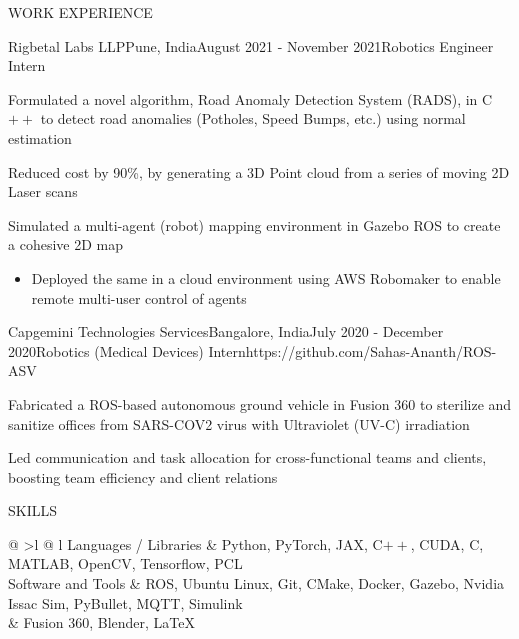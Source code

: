 \documentclass{resume} %
\begin{document}
\begin{rSection}{WORK EXPERIENCE}
	\begin{rProjExpDetails}{Rigbetal Labs LLP}{Pune, India}{August 2021 - November 2021}{Robotics Engineer Intern}{}{}
		\item Formulated a novel algorithm, Road Anomaly Detection System (RADS), in C$++$ to detect road anomalies (Potholes, Speed Bumps, etc.) using normal estimation
		\item Reduced cost by 90\%, by generating a 3D Point cloud from a series of moving 2D Laser scans
		\item Simulated a multi-agent (robot) mapping environment in Gazebo ROS to create a cohesive 2D map
		\begin{itemize}
			\item Deployed the same in a cloud environment using AWS Robomaker to enable remote multi-user control of agents
		\end{itemize}
	\end{rProjExpDetails}

	\begin{rProjExpDetails}{Capgemini Technologies Services}{Bangalore, India}{July 2020 - December 2020}{Robotics (Medical Devices) Intern}{https://github.com/Sahas-Ananth/ROS-ASV}{}
		\item Fabricated a ROS-based autonomous ground vehicle in Fusion 360 to sterilize and sanitize offices from SARS-COV2 virus with Ultraviolet (UV-C) irradiation
		\item Led communication and task allocation for cross-functional teams and clients, boosting team efficiency and client relations
	\end{rProjExpDetails}
\end{rSection}
\begin{rSection}{SKILLS}
	\begin{tabular}{ @ {} >{\bfseries}l @{\hspace{3ex}} l }
		Languages / Libraries & Python, PyTorch, JAX, C$++$, CUDA, C, MATLAB, OpenCV, Tensorflow, PCL                     \\
		Software and Tools    & ROS, Ubuntu Linux, Git, CMake, Docker, Gazebo, Nvidia Issac Sim, PyBullet, MQTT, Simulink \\
		                      & Fusion 360, Blender, LaTeX                                                                \\
	\end{tabular}
\end{rSection}
\vspace{-3.0mm}
\end{document}
